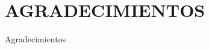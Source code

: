\chapter*{\centering \large AGRADECIMIENTOS}

\doublespacing

\begin{flushright} %
Agradecimientos


\end{flushright}